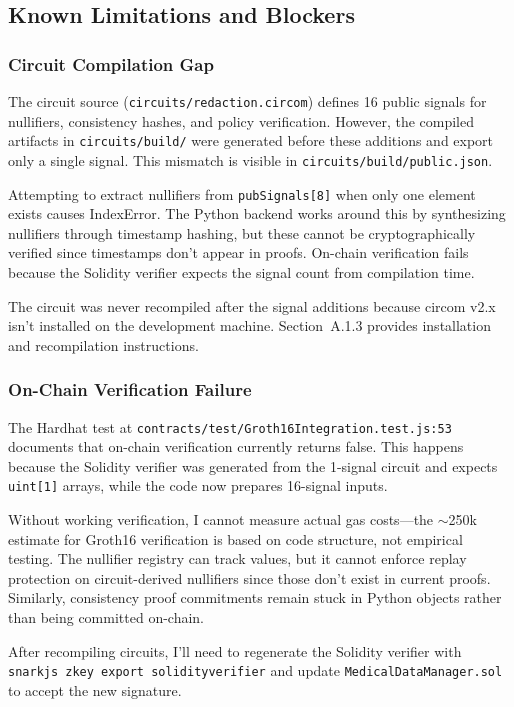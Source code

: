 \subsection{Known Limitations and Blockers}

\subsubsection{Circuit Compilation Gap}

The circuit source (\texttt{circuits/redaction.circom}) defines 16 public signals for nullifiers, consistency hashes, and policy verification. However, the compiled artifacts in \texttt{circuits/build/} were generated before these additions and export only a single signal. This mismatch is visible in \texttt{circuits/build/public.json}.

Attempting to extract nullifiers from \texttt{pubSignals[8]} when only one element exists causes IndexError. The Python backend works around this by synthesizing nullifiers through timestamp hashing, but these cannot be cryptographically verified since timestamps don't appear in proofs. On-chain verification fails because the Solidity verifier expects the signal count from compilation time.

The circuit was never recompiled after the signal additions because circom v2.x isn't installed on the development machine. Section~A.1.3 provides installation and recompilation instructions.

\subsubsection{On-Chain Verification Failure}

The Hardhat test at \texttt{contracts/test/Groth16Integration.test.js:53} documents that on-chain verification currently returns false. This happens because the Solidity verifier was generated from the 1-signal circuit and expects \texttt{uint[1]} arrays, while the code now prepares 16-signal inputs.

Without working verification, I cannot measure actual gas costs---the $\sim$250k estimate for Groth16 verification is based on code structure, not empirical testing. The nullifier registry can track values, but it cannot enforce replay protection on circuit-derived nullifiers since those don't exist in current proofs. Similarly, consistency proof commitments remain stuck in Python objects rather than being committed on-chain.

After recompiling circuits, I'll need to regenerate the Solidity verifier with \texttt{snarkjs zkey export solidityverifier} and update \texttt{MedicalDataManager.sol} to accept the new signature.

